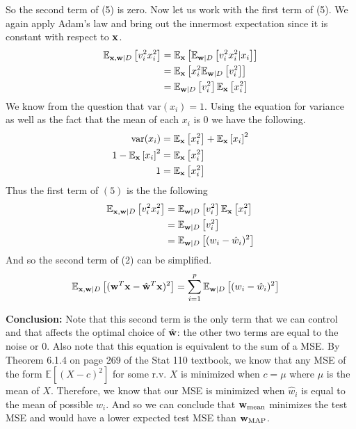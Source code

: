 \documentclass[submit]{harvardml}
\newcommand{\wmean}{\vb{w}_{\text{mean}}}
\newcommand{\what}{\hat{\vb{w}}}
\newcommand{\E}{\mathbb{E}}
\begin{document}
So the second term of (5) is zero. Now let us work with the first term of (5). We again apply Adam's law and bring out the innermost expectation since it is constant with respect to $\vb{x}$.
\begin{align*}
    \E_{\vb{x}, \vb{w} | D}\left[ v_i^2 x_i^2\right] &= \E_{\vb{x}}\left[ \E_{\vb{w} | D} \left[ v_i^2 x_i^2 | x_i \right]\right]\\
    &= \E_{\vb{x}}\left[ x_i^2  \E_{\vb{w} | D} \left[ v_i^2 \right]\right] \\
    &= \E_{\vb{w} | D} \left[ v_i^2 \right] \E_{\vb{x}}\left[ x_i^2 \right]
\end{align*}
We know from the question that $\text{var}(x_i) = 1$. Using the equation for variance as well as the fact that the mean of each $x_i$ is $0$ we have the following.
\begin{align*}
    \text{var}(x_i) &= \E_{\vb{x}} \left[ x_i^2 \right] + \E_{\vb{x}} \left[ x_i \right]^2 \\
    1 - \E_{\vb{x}} \left[ x_i \right]^2 &= \E_{\vb{x}} \left[ x_i^2 \right] \\
    1 &= \E_{\vb{x}} \left[ x_i^2 \right]
\end{align*}
Thus the first term of $(5)$ is the the following
\begin{align*}
    \E_{\vb{x}, \vb{w} | D}\left[ v_i^2 x_i^2\right] &= \E_{\vb{w} | D} \left[ v_i^2 \right] \E_{\vb{x}}\left[ x_i^2 \right] \\
    &= \E_{\vb{w} | D} \left[ v_i^2 \right] \\
    &= \E_{\vb{w} | D} \left[ (w_i - \hat{w}_i)^2 \right]
\end{align*}
And so the second term of (2) can be simplified.
\begin{align*}
    \E_{\vb{x}, \vb{w} | D}\left[(\vb{w}^T\vb{x} - \what^T \vb{x})^2\right] &= \sum_{i=1}^p \E_{\vb{w} | D}\left[ (w_i - \hat{w}_i)^2 \right]
\end{align*}

\textbf{Conclusion:} Note that this second term is the only term that we can control and that affects the optimal choice of $\what$: the other two terms are equal to the noise or $0$. Also note that this equation is equivalent to the sum of a MSE. By Theorem 6.1.4 on page 269 of the Stat 110 textbook, we know that any MSE of the form $\E[(X - c)^2]$ for some r.v. $X$ is minimized when $c = \mu$ where $\mu$ is the mean of $X$. Therefore, we know that our MSE is minimized when $\hat{w}_i$ is equal to the mean of possible $w_i$. And so we can conclude that $\wmean$ minimizes the test MSE and would have a lower expected test MSE than $\vb{w}_{\text{MAP}}$.
\end{document}
